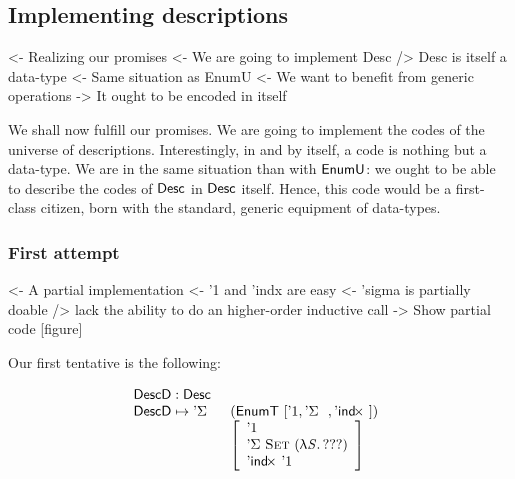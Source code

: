 \subsection{Implementing descriptions}

\begin{wstructure}
<- Realizing our promises
    <- We are going to implement Desc
    /> Desc is itself a data-type
        <- Same situation as EnumU
            <- We want to benefit from generic operations
        -> It ought to be encoded in itself
\end{wstructure}

We shall now fulfill our promises. We are going to implement the codes
of the universe of descriptions. Interestingly, in and by itself, a
code is nothing but a data-type. We are in the same situation than
with $\EnumU$: we ought to be able to describe the codes of $\Desc$ in
$\Desc$ itself. Hence, this code would be a first-class citizen, born
with the standard, generic equipment of data-types.

\subsubsection{First attempt}

\begin{wstructure}
<- A partial implementation
    <- '1 and 'indx are easy
    <- 'sigma is partially doable
        /> lack the ability to do an higher-order inductive call
    -> Show partial code [figure]
\end{wstructure}

Our first tentative is the following:

\[\stk{
\DescD : \Desc \\
\begin{array}{@{}ll}
\DescD \mapsto \DSigma{}{} & (\EnumT [ \DUnit, \DSigma{}{}, \DIndx{} ])  \\
                           & \left[\begin{array}{l}
                                   \DUnit                                \\
                                   \DSigma{\Set}{(\LAM{\V{S}} ???)}      \\
                                   \DIndx{\DUnit}                        \\
                                   \end{array}
                             \right]
\end{array}
}\]

